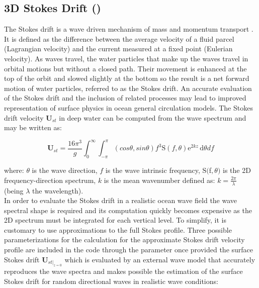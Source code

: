 \documentclass[../main/NEMO_manual]{subfiles}
\begin{document}
\subsection{3D Stokes Drift (\protect{})}
\label{subsec:SBC_wave_sdw}

The Stokes drift is a wave driven mechanism of mass and momentum transport \citep{Stokes_1847}. 
It is defined as the difference between the average velocity of a fluid parcel (Lagrangian velocity) 
and the current measured at a fixed point (Eulerian velocity). 
As waves travel, the water particles that make up the waves travel in orbital motions but 
without a closed path. Their movement is enhanced at the top of the orbit and slowed slightly 
at the bottom so the result is a net forward motion of water particles, referred to as the Stokes drift. 
An accurate evaluation of the Stokes drift and the inclusion of related processes may lead to improved 
representation of surface physics in ocean general circulation models.
The Stokes drift velocity $\mathbf{U}_{st}$ in deep water can be computed from the wave spectrum and may be written as: 

\[
  \mathbf{U}_{st} = \frac{16{\pi^3}} {g}
  \int_0^\infty \int_{-\pi}^{\pi} (cos{\theta},sin{\theta}) {f^3}
  \mathrm{S}(f,\theta) \mathrm{e}^{2kz}\,\mathrm{d}\theta {d}f
\]

where: ${\theta}$ is the wave direction, $f$ is the wave intrinsic frequency, 
$\mathrm{S}($f$,\theta)$ is the 2D frequency-direction spectrum, 
$k$ is the mean wavenumber defined as: 
$k=\frac{2\pi}{\lambda}$ (being $\lambda$ the wavelength). \\

In order to evaluate the Stokes drift in a realistic ocean wave field the wave spectral shape is required 
and its computation quickly becomes expensive as the 2D spectrum must be integrated for each vertical level. 
To simplify, it is customary to use approximations to the full Stokes profile.
Three possible parameterizations for the calculation for the approximate Stokes drift velocity profile 
are included in the code through the  parameter once provided the surface Stokes drift 
$\mathbf{U}_{st |_{z=0}}$ which is evaluated by an external wave model that accurately reproduces the wave spectra 
and makes possible the estimation of the surface Stokes drift for random directional waves in 
realistic wave conditions:
\end{document}
